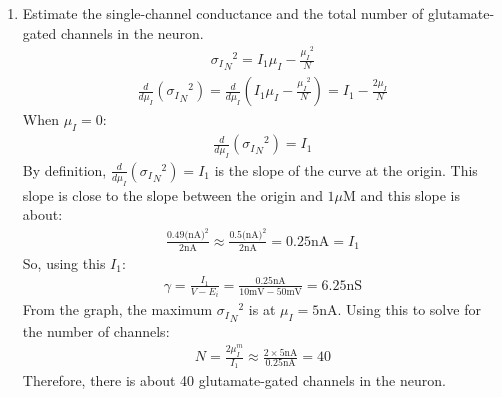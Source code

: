 \documentclass[11pt]{article}
\begin{document}
\begin{enumerate}[label=\arabic*.]
\begin{enumerate}[label=(\alph*)]
\item
Estimate the single-channel conductance and the total number of glutamate-gated channels in the neuron.
\begin{align*}
{{\sigma_{I}}_{N}} ^ 2 = I_1 \mu_I - \frac{{\mu_I}^2} {N}
\end{align*}
\begin{align*}
\frac{d} {d\mu_I} \left({{\sigma_{I}}_{N}} ^ 2\right) = \frac{d} {d\mu_I} \left(I_1 \mu_I - \frac{{\mu_I}^2} {N}\right) = I_1 - \frac{2 \mu_I} {N}
\end{align*}
When $\mu_I = 0$:
\begin{align*}
\frac{d} {d\mu_I} \left({{\sigma_{I}}_{N}} ^ 2\right) = I_1
\end{align*}
By definition, $\frac{d} {d\mu_I} \left({{\sigma_{I}}_{N}} ^ 2\right) = I_1$ is the slope of the curve at the origin. This slope is close to the slope between the origin and $1 \mu\text{M}$ and this slope is about:
\begin{align*}
\frac{0.49 \text{(nA)}^2} {2 \text{nA}} \approx \frac{0.5 \text{(nA)}^2} {2 \text{nA}} = 0.25 \text{nA} = I_1
\end{align*}
So, using this $I_1$:
\begin{align*}
\gamma = \frac{I_1} {V - E_i} = \frac{0.25 \text{nA}} {10 \text{mV} - 50 \text{mV}} = 6.25 \text{nS}
\end{align*}
From the graph, the maximum ${{\sigma_{I}}_{N}} ^ 2$ is at $\mu_I = 5 \text{nA}$. Using this to solve for the number of channels:
\begin{align*}
N = \frac{2 \mu_I^m} {I_1} \approx \frac{2 \times 5 \text{nA}} {0.25 \text{nA}} = 40
\end{align*}
Therefore, there is about 40 glutamate-gated channels in the neuron.
\end{enumerate}
\end{enumerate}
\end{document}
